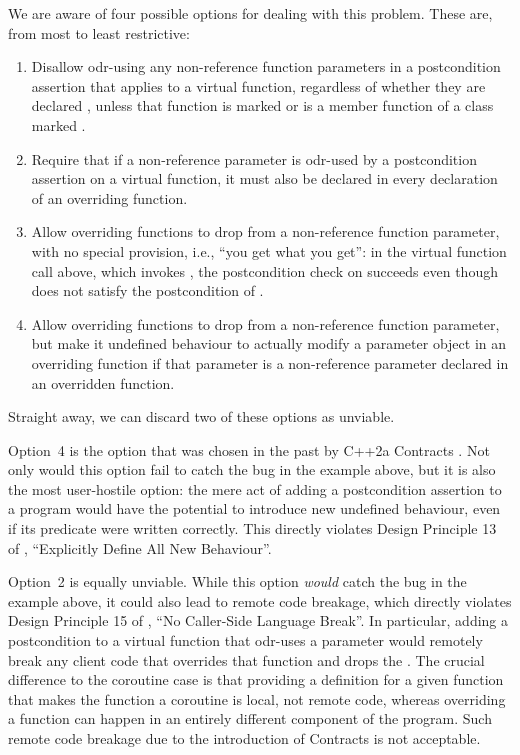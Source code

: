 We are aware of four possible options for dealing with this problem. These are, from most to least restrictive:
\begin{enumerate}
\item Disallow odr-using any non-reference function parameters in a postcondition assertion that applies to a virtual function, regardless of whether they are declared , unless that function is marked  or is a member function of a class marked .
\item Require that if a non-reference parameter is odr-used by a postcondition assertion on a virtual function, it must also be declared  in every declaration of an overriding function.
\item Allow overriding functions to drop  from a non-reference function parameter, with no special provision, i.e., ``you get what you get'': in the virtual function call above, which invokes , the postcondition check on  succeeds even though  does not satisfy the postcondition of .
\item Allow overriding functions to drop  from a non-reference function parameter, but make it undefined behaviour to actually modify a parameter object in an overriding function if that parameter is a non-reference parameter declared  in an overridden function.
\end{enumerate}
Straight away, we can discard two of these options as unviable.

Option~4 is the option that was chosen in the past by C++2a Contracts \cite{P0542R5}. Not only would this option fail to catch the bug in the example above, but it is also the most user-hostile option: the mere act of adding a postcondition assertion to a program would have the potential to introduce new undefined behaviour, even if its predicate were written correctly. This directly violates Design Principle 13 of \cite{P2900R10}, ``Explicitly Define All New Behaviour''.

Option~2 is equally unviable. While this option \emph{would} catch the bug in the example above, it could also lead to remote code breakage, which directly violates Design Principle 15 of \cite{P2900R10}, ``No Caller-Side Language Break''. In particular, adding a postcondition to a virtual function that odr-uses a  parameter would remotely break any client code that overrides that function and drops the . The crucial difference to the coroutine case is that providing a definition for a given function that makes the function a coroutine is local, not remote code, whereas overriding a function can happen in an entirely different component of the program. Such remote code breakage due to the introduction of Contracts is not acceptable.

